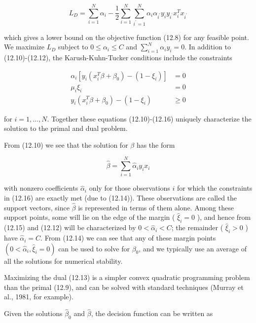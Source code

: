 \documentclass[10pt]{article}
\begin{document}
\begin{equation*}
L_{D}=\sum_{i=1}^{N} \alpha_{i}-\frac{1}{2} \sum_{i=1}^{N} \sum_{i^{\prime}=1}^{N} \alpha_{i} \alpha_{i^{\prime}} y_{i} y_{i^{\prime}} x_{i}^{T} x_{i^{\prime}} \tag{12.13}
\end{equation*}


which gives a lower bound on the objective function (12.8) for any feasible point. We maximize $L_{D}$ subject to $0 \leq \alpha_{i} \leq C$ and $\sum_{i=1}^{N} \alpha_{i} y_{i}=0$. In addition to (12.10)-(12.12), the Karush-Kuhn-Tucker conditions include the constraints


\begin{align*}
\alpha_{i}\left[y_{i}\left(x_{i}^{T} \beta+\beta_{0}\right)-\left(1-\xi_{i}\right)\right] & =0  \tag{12.14}\\
\mu_{i} \xi_{i} & =0  \tag{12.15}\\
y_{i}\left(x_{i}^{T} \beta+\beta_{0}\right)-\left(1-\xi_{i}\right) & \geq 0 \tag{12.16}
\end{align*}


for $i=1, \ldots, N$. Together these equations (12.10)-(12.16) uniquely characterize the solution to the primal and dual problem.

From (12.10) we see that the solution for $\beta$ has the form


\begin{equation*}
\hat{\beta}=\sum_{i=1}^{N} \hat{\alpha}_{i} y_{i} x_{i} \tag{12.17}
\end{equation*}


with nonzero coefficients $\hat{\alpha}_{i}$ only for those observations $i$ for which the constraints in (12.16) are exactly met (due to (12.14)). These observations are called the support vectors, since $\hat{\beta}$ is represented in terms of them alone. Among these support points, some will lie on the edge of the margin ( $\hat{\xi}_{i}=0$ ), and hence from (12.15) and (12.12) will be characterized by $0<\hat{\alpha}_{i}<C$; the remainder ( $\hat{\xi}_{i}>0$ ) have $\hat{\alpha}_{i}=C$. From (12.14) we can see that any of these margin points $\left(0<\hat{\alpha}_{i}, \hat{\xi}_{i}=0\right)$ can be used to solve for $\beta_{0}$, and we typically use an average of all the solutions for numerical stability.

Maximizing the dual (12.13) is a simpler convex quadratic programming problem than the primal (12.9), and can be solved with standard techniques (Murray et al., 1981, for example).

Given the solutions $\hat{\beta}_{0}$ and $\hat{\beta}$, the decision function can be written as
\end{document}
